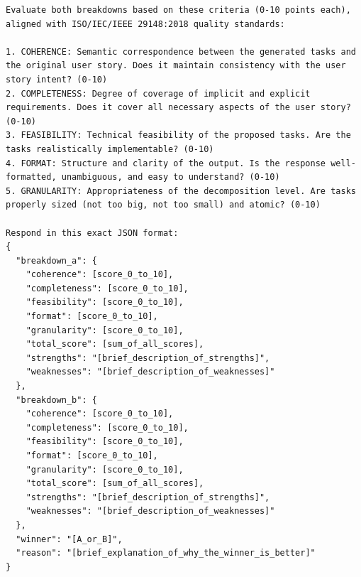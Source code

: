 \documentclass[pdflatex,sn-mathphys-num]{sn-jnl}
\theoremstyle{thmstyleone}%
\theoremstyle{thmstyletwo}%
\theoremstyle{thmstylethree}%
\begin{document}
\begin{appendices}
\begin{lstlisting}[basicstyle=\ttfamily\small, breaklines=true, caption={LLM-as-a-Judge Prompt}, label={lst:llm_judge_prompt}]
Evaluate both breakdowns based on these criteria (0-10 points each), aligned with ISO/IEC/IEEE 29148:2018 quality standards:

1. COHERENCE: Semantic correspondence between the generated tasks and the original user story. Does it maintain consistency with the user story intent? (0-10)
2. COMPLETENESS: Degree of coverage of implicit and explicit requirements. Does it cover all necessary aspects of the user story? (0-10)
3. FEASIBILITY: Technical feasibility of the proposed tasks. Are the tasks realistically implementable? (0-10)
4. FORMAT: Structure and clarity of the output. Is the response well-formatted, unambiguous, and easy to understand? (0-10)
5. GRANULARITY: Appropriateness of the decomposition level. Are tasks properly sized (not too big, not too small) and atomic? (0-10)

Respond in this exact JSON format:
{
  "breakdown_a": {
    "coherence": [score_0_to_10],
    "completeness": [score_0_to_10],
    "feasibility": [score_0_to_10],
    "format": [score_0_to_10],
    "granularity": [score_0_to_10],
    "total_score": [sum_of_all_scores],
    "strengths": "[brief_description_of_strengths]",
    "weaknesses": "[brief_description_of_weaknesses]"
  },
  "breakdown_b": {
    "coherence": [score_0_to_10],
    "completeness": [score_0_to_10],
    "feasibility": [score_0_to_10],
    "format": [score_0_to_10],
    "granularity": [score_0_to_10],
    "total_score": [sum_of_all_scores],
    "strengths": "[brief_description_of_strengths]",
    "weaknesses": "[brief_description_of_weaknesses]"
  },
  "winner": "[A_or_B]",
  "reason": "[brief_explanation_of_why_the_winner_is_better]"
}
\end{lstlisting}

\end{appendices}


\end{document}

